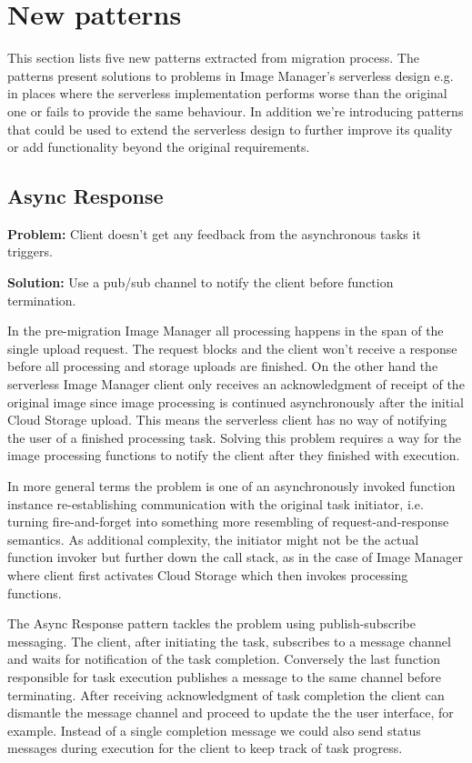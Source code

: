 \section{New patterns} \label{sec:newPatterns}

This section lists five new patterns extracted from migration process. The patterns present solutions to problems in Image Manager's serverless design e.g. in places where the serverless implementation performs worse than the original one or fails to provide the same behaviour. In addition we're introducing patterns that could be used to extend the serverless design to further improve its quality or add functionality beyond the original requirements.

\subsection{Async Response} \label{subsec:AsyncResponse}

\textbf{Problem:} Client doesn't get any feedback from the asynchronous tasks it triggers.


\textbf{Solution:} Use a pub/sub channel to notify the client before function termination.

In the pre-migration Image Manager all processing happens in the span of the single upload request. The request blocks and the client won't receive a response before all processing and storage uploads are finished. On the other hand the serverless Image Manager client only receives an acknowledgment of receipt of the original image since image processing is continued asynchronously after the initial Cloud Storage upload. This means the serverless client has no way of notifying the user of a finished processing task. Solving this problem requires a way for the image processing functions to notify the client after they finished with execution.

In more general terms the problem is one of an asynchronously invoked function instance re-establishing communication with the original task initiator, i.e. turning fire-and-forget into something more resembling of request-and-response semantics. As additional complexity, the initiator might not be the actual function invoker but further down the call stack, as in the case of Image Manager where client first activates Cloud Storage which then invokes processing functions.

The Async Response pattern tackles the problem using publish-subscribe messaging. The client, after initiating the task, subscribes to a message channel and waits for notification of the task completion. Conversely the last function responsible for task execution publishes a message to the same channel before terminating. After receiving acknowledgment of task completion the client can dismantle the message channel and proceed to update the the user interface, for example. Instead of a single completion message we could also send status messages during execution for the client to keep track of task progress.

